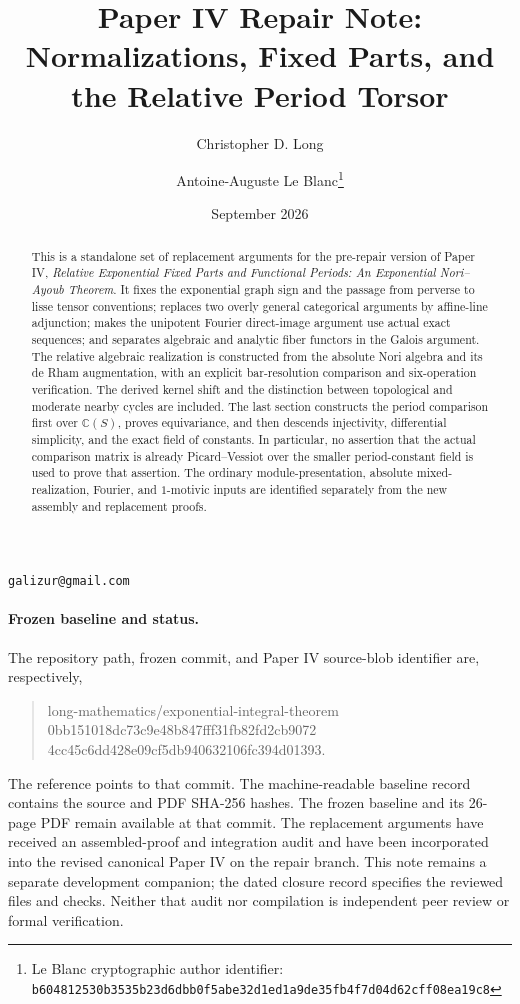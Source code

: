 \documentclass[11pt]{article}
\title{Paper IV Repair Note:\\
Normalizations, Fixed Parts, and the Relative Period Torsor}
\author{Christopher D. Long \and Antoine-Auguste Le Blanc\thanks{Le Blanc cryptographic author identifier: \texttt{b6048125\allowbreak{}30b3535b\allowbreak{}23d6dbb0\allowbreak{}f5abe32d\allowbreak{}1ed1a9de\allowbreak{}35fb4f7d\allowbreak{}04d62cff\allowbreak{}08ea19c8}}}
\date{September 2026}
\numberwithin{equation}{section}
\theoremstyle{definition}
\theoremstyle{remark}
\newcommand{\C}{\mathbb C}
\begin{document}
\maketitle

\begin{center}
\small
\texttt{galizur@gmail.com}
\end{center}

\begin{abstract}
This is a standalone set of replacement arguments for the pre-repair version
of Paper IV, \emph{Relative Exponential Fixed Parts and Functional Periods:
An Exponential Nori--Ayoub Theorem}. It fixes the exponential graph sign and
the passage from perverse to lisse tensor conventions; replaces two overly
general categorical arguments by affine-line adjunction; makes the unipotent
Fourier direct-image argument use actual exact sequences; and separates
algebraic and analytic fiber functors in the Galois argument. The relative
algebraic realization is constructed from the absolute Nori algebra and its
de Rham augmentation, with an explicit bar-resolution comparison and
six-operation verification. The derived kernel shift and the distinction
between topological and moderate nearby cycles are included. The last section
constructs the period comparison first over $\C(S)$, proves equivariance,
and then descends injectivity, differential simplicity, and the exact field
of constants. In particular, no assertion that the actual comparison matrix
is already Picard--Vessiot over the smaller period-constant field is used to
prove that assertion. The ordinary module-presentation,
absolute mixed-realization, Fourier, and $1$-motivic inputs are identified
separately from the new assembly and replacement proofs.
\end{abstract}

\paragraph{Frozen baseline and status.}
The repository path, frozen commit, and Paper IV source-blob identifier are,
respectively,
\begin{quote}\small\ttfamily
long-mathematics/exponential-integral-theorem\\
0bb151018dc73c9e48b847fff31fb82fd2cb9072\\
4cc45c6dd428e09cf5db940632106fc394d01393.
\end{quote}
The reference  points to that
commit. The machine-readable baseline record contains the source and PDF
SHA-256 hashes. The frozen baseline and its 26-page PDF remain available at
that commit. The replacement arguments have received an assembled-proof
and integration audit and have been incorporated into the revised canonical
Paper IV on the repair branch. This note remains a separate development
companion; the dated closure record specifies the reviewed files and checks.
Neither that audit nor compilation is independent peer review or formal
verification.
\end{document}

